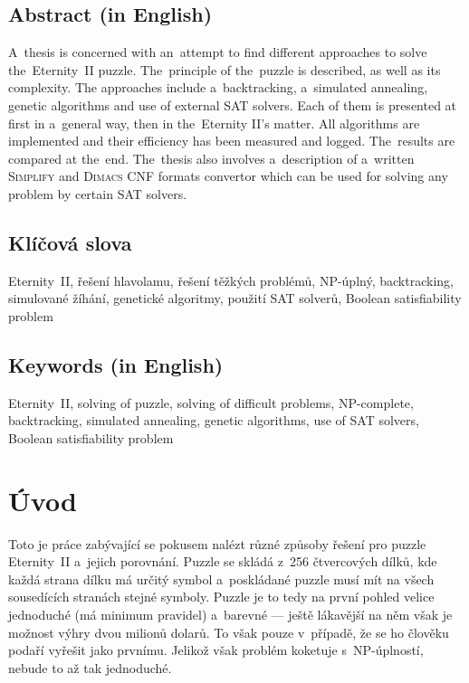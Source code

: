 \documentclass[11pt, titlepage]{report}
\begin{document}
\section*{Abstract (in English)}

\noindent A~thesis is concerned with an~attempt to find different approaches to solve the~Eternity~II puzzle. The~principle of the~puzzle is described, as well as its complexity. The approaches include a~backtracking, a~simulated annealing, genetic algorithms and use of external SAT solvers. Each of them is presented at first in a~general way, then in the~Eternity II's matter. All algorithms are implemented and their efficiency has been measured and logged. The~results are compared at the~end. The~thesis also involves a~description of a~written \textsc{Simplify} and \textsc{Dimacs CNF} formats convertor which can be used for solving any problem by certain SAT solvers.

\section*{Klíčová slova}

\noindent Eternity~II, řešení hlavolamu, řešení těžkých problémů, NP-úplný, backtracking, simulované žíhání, genetické algoritmy, použití SAT solverů, Boolean satisfiability problem

\section*{Keywords (in English)}

\noindent Eternity~II, solving of puzzle, solving of difficult problems, NP-complete, backtracking, simulated annealing, genetic algorithms, use of SAT solvers, Boolean satisfiability problem


\setcounter{page}{0}
\tableofcontents


\chapter{Úvod}

Toto je práce zabývající se pokusem nalézt různé způsoby řešení pro puzzle Eternity~II a~jejich porovnání. Puzzle se skládá z~256 čtvercových dílků, kde každá strana dílku má určitý symbol a~poskládané puzzle musí mít na všech sousedících stranách stejné symboly. Puzzle je to tedy na první pohled velice jednoduché (má minimum pravidel) a~barevné --- ještě lákavější na něm však je možnost výhry dvou milionů dolarů. To však pouze v~případě, že se ho člověku podaří vyřešit jako prvnímu. Jelikož však problém koketuje s~NP-úplností, nebude to až tak jednoduché.
\end{document}
